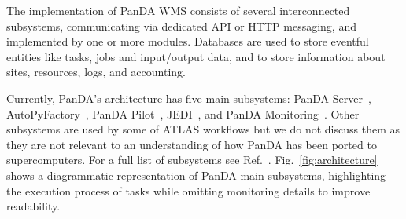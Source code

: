 


The implementation of PanDA WMS consists of several interconnected
subsystems,
communicating via dedicated API or HTTP messaging, and implemented by one or
more modules. Databases are used to store eventful entities like tasks, jobs
and input/output data, and to store information about sites, resources,
logs, and accounting.

Currently, PanDA's architecture has five main subsystems: PanDA
Server~\cite{maeno2011overview},
AutoPyFactory~\cite{caballero2012autopyfactory}, PanDA
Pilot~\cite{nilsson2011atlas}, JEDI~\cite{borodin2015scaling}, and PanDA
Monitoring~\cite{klimentov2011atlas}. Other subsystems are used by some of
ATLAS workflows %
but we do not discuss them as they are not relevant to an understanding of
how PanDA has been ported to supercomputers. For a full list of subsystems
see Ref.~\cite{panda-wiki_url}. Fig.~\ref{fig:architecture} shows a
diagrammatic representation of PanDA main subsystems, highlighting the
execution process of tasks while omitting monitoring details to improve
readability.

